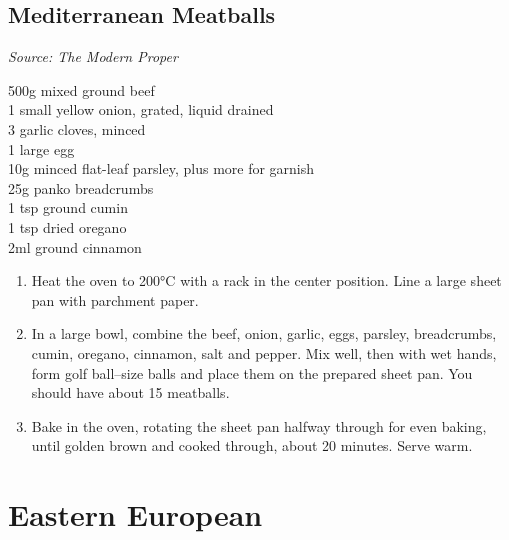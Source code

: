\documentclass{report}
\begin{document}
\section{Mediterranean Meatballs}
\textit{Source: The Modern Proper}\\
\begin{minipage}[t]{0.21\textwidth} \vspace{0pt} 
500g mixed ground beef\\
1 small yellow onion, grated, liquid drained\\
3 garlic cloves, minced\\
1 large egg\\
10g minced flat-leaf parsley, plus more for garnish\\
25g panko breadcrumbs\\
1 tsp ground cumin\\
1 tsp dried oregano\\
2ml ground cinnamon
\end{minipage}
\hfill
\begin{minipage}[t]{0.78\textwidth} \vspace{0pt}
	\begin{enumerate}
		\item Heat the oven to 200°C with a rack in the center position. Line a large sheet pan with parchment paper.
		\item In a large bowl, combine the beef, onion, garlic, eggs, parsley, breadcrumbs, cumin, oregano, cinnamon, salt and pepper. Mix well, then with wet hands, form golf ball–size balls and place them on the prepared sheet pan. You should have about 15 meatballs.
		\item Bake in the oven, rotating the sheet pan halfway through for even baking, until golden brown and cooked through, about 20 minutes. Serve warm.
	\end{enumerate}	
\end{minipage}

\chapter{Eastern European}
\end{document}
